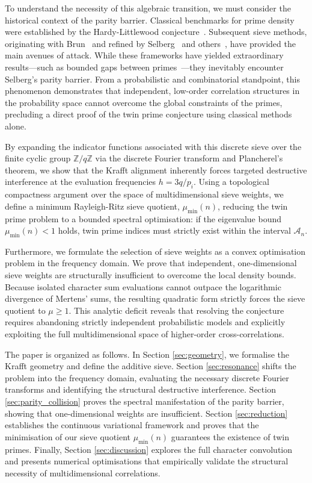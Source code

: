 \documentclass[10pt,twoside]{article}
\theoremstyle{cpctheorem}
\theoremstyle{cpcremark}
\begin{document}
To understand the necessity of this algebraic transition, we must consider the historical context
of the parity barrier. Classical benchmarks for prime density were established by the
Hardy-Littlewood conjecture~\cite{HardyLittlewood1923}. Subsequent sieve methods, originating with
Brun~\cite{Brun1919} and refined by Selberg~\cite{Selberg1947} and
others~\cite{MontgomeryVaughan2006}, have provided the main avenues of attack. While these
frameworks have yielded extraordinary results---such as bounded gaps between
primes~\cite{GPY2009,Maynard2015,Polymath8a,Polymath8b}---they inevitably encounter Selberg's
parity barrier. From a probabilistic and combinatorial standpoint, this phenomenon demonstrates
that independent, low-order correlation structures in the probability space cannot overcome the
global constraints of the primes, precluding a direct proof of the twin prime conjecture using
classical methods alone.

By expanding the indicator functions associated with this discrete sieve over the finite cyclic
group $\mathbb{Z}/q\mathbb{Z}$ via the discrete Fourier transform and Plancherel's theorem, we show
that the Krafft alignment inherently forces targeted destructive interference at the evaluation
frequencies $h = 3q/p_i$. Using a topological compactness argument over the space of
multidimensional sieve weights, we define a minimum Rayleigh-Ritz sieve quotient, $\mu_{\min}(n)$,
reducing the twin prime problem to a bounded spectral optimisation: if the eigenvalue bound
$\mu_{\min}(n) < 1$ holds, twin prime indices must strictly exist within the interval
$\mathcal{A}_n$.

Furthermore, we formulate the selection of sieve weights as a convex optimisation problem in the
frequency domain. We prove that independent, one-dimensional sieve weights are structurally
insufficient to overcome the local density bounds. Because isolated character sum evaluations
cannot outpace the logarithmic divergence of Mertens' sums, the resulting quadratic form strictly
forces the sieve quotient to $\mu \ge 1$. This analytic deficit reveals that resolving the
conjecture requires abandoning strictly independent probabilistic models and explicitly exploiting
the full multidimensional space of higher-order cross-correlations.

The paper is organized as follows. In Section \ref{sec:geometry}, we formalise the Krafft geometry
and define the additive sieve. Section \ref{sec:resonance} shifts the problem into the frequency
domain, evaluating the necessary discrete Fourier transforms and identifying the structural
destructive interference. Section \ref{sec:parity_collision} proves the spectral manifestation of
the parity barrier, showing that one-dimensional weights are insufficient. Section \ref{sec:reduction}
establishes the continuous variational framework and proves that the minimisation of our sieve
quotient $\mu_{\min}(n)$ guarantees the existence of twin primes. Finally, Section \ref{sec:discussion}
explores the full character convolution and presents numerical optimisations that empirically
validate the structural necessity of multidimensional correlations.
\end{document}

